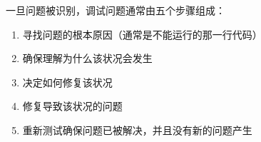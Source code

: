 \documentclass[../../LearnCpp.tex]{subfiles}
\begin{document}

一旦问题被识别，调试问题通常由五个步骤组成：

\begin{enumerate}
  \item 寻找问题的根本原因（通常是不能运行的那一行代码）
  \item 确保理解为什么该状况会发生
  \item 决定如何修复该状况
  \item 修复导致该状况的问题
  \item 重新测试确保问题已被解决，并且没有新的问题产生
\end{enumerate}
\end{document}
